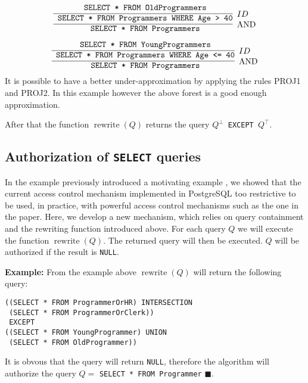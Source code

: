 \[
\infer[\text{AND}]
	{\text{\texttt{ SELECT * FROM Programmers}}}
	{
		\infer[ID]
		{\text{\texttt{ SELECT * FROM Programmers WHERE Age > 40}}}
		{\text{\texttt{ SELECT * FROM OldProgrammers}}}
	}	
\]

\[
\infer[\text{AND}]
	{\text{\texttt{ SELECT * FROM Programmers}}}
	{
		\infer[ID]
		{\text{\texttt{ SELECT * FROM Programmers WHERE Age <= 40}}}
		{\text{\texttt{ SELECT * FROM YoungProgrammers}}}
	}
\]
\noindent
It is possible to have a better under-approximation by applying the rules PROJ1 and PROJ2. In this example however the above forest is a good enough approximation.

After that the function $\operatorname{rewrite}(Q)$ returns the query \texttt{$Q^\bot$ EXCEPT $Q^\top$}.

\subsection{Authorization of \texttt{SELECT} queries}

In the example previously introduced a motivating example , we showed that the current access control mechanism implemented in PostgreSQL too restrictive to be used, in practice, with powerful access control mechanisms such as the one in the paper.
%
Here, we develop a new mechanism, which relies on query containment and the rewriting function introduced above.
%
For each query $Q$ we will execute the function $\operatorname{rewrite}(Q)$.
%
The returned query will then be executed.
%
$Q$ will be authorized if the result is \texttt{NULL}.

\smallskip
\noindent
{\bf Example:}
From the example above $\operatorname{rewrite}(Q)$ will return the following query:
\begin{verbatim}
((SELECT * FROM ProgrammerOrHR) INTERSECTION
 (SELECT * FROM ProgrammerOrClerk))
 EXCEPT
((SELECT * FROM YoungProgrammer) UNION
 (SELECT * FROM OldProgrammer))
\end{verbatim}
\noindent
It is obvous that the query will return \texttt{NULL}, therefore the algorithm will authorize the query $Q = $ \texttt{SELECT * FROM Programmer} $\blacksquare$.